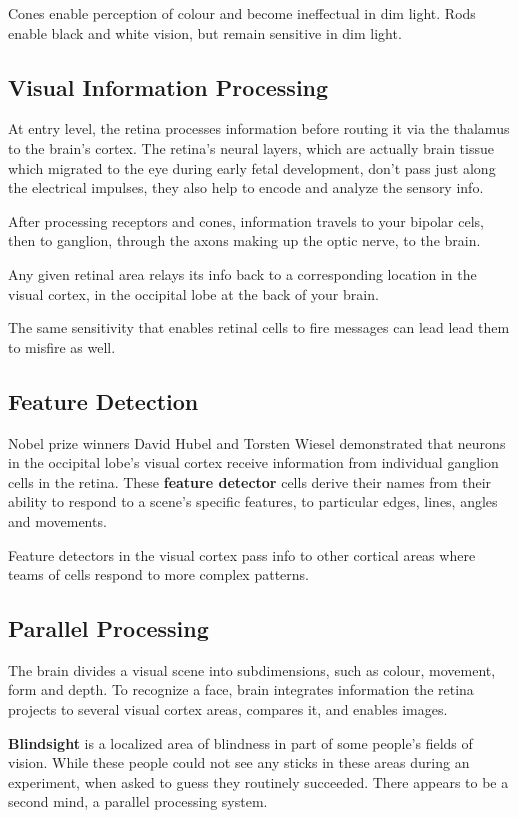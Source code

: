 \documentclass[12pt]{article}
\begin{document}
Cones enable perception of colour and become ineffectual in dim light. Rods enable black and white vision, but remain sensitive in dim light.

\subsection{Visual Information Processing}
At entry level, the retina processes information before routing it via the thalamus to the brain's cortex. The retina's neural layers, which are actually brain tissue which migrated to the eye during early fetal development, don't pass just along the electrical impulses, they also help to encode and analyze the sensory info.

After processing receptors and cones, information travels to your bipolar cels, then to ganglion, through the axons making up the optic nerve, to the brain.

Any given retinal area relays its info back to a corresponding location in the visual cortex, in the occipital lobe at the back of your brain.

The same sensitivity that enables retinal cells to fire messages can lead lead them to misfire as well.

\subsection*{Feature Detection}
Nobel prize winners David Hubel and Torsten Wiesel demonstrated that neurons in the occipital lobe's visual cortex receive information from individual ganglion cells in the retina. These \textbf{feature detector} cells derive their names from their ability to respond to a scene's specific features, to particular edges, lines, angles and movements.

Feature detectors in the visual cortex pass info to other cortical areas where teams of cells respond to more complex patterns.

\subsection*{Parallel Processing}
The brain divides a visual scene into subdimensions, such as colour, movement, form and depth. To recognize a face, brain integrates information the retina projects to several visual cortex areas, compares it, and enables images.

\textbf{Blindsight} is a localized area of blindness in part of some people's fields of vision. While these people could not see any sticks in these areas during an experiment, when asked to guess they routinely succeeded. There appears to be a second mind, a parallel processing system.
\end{document}
